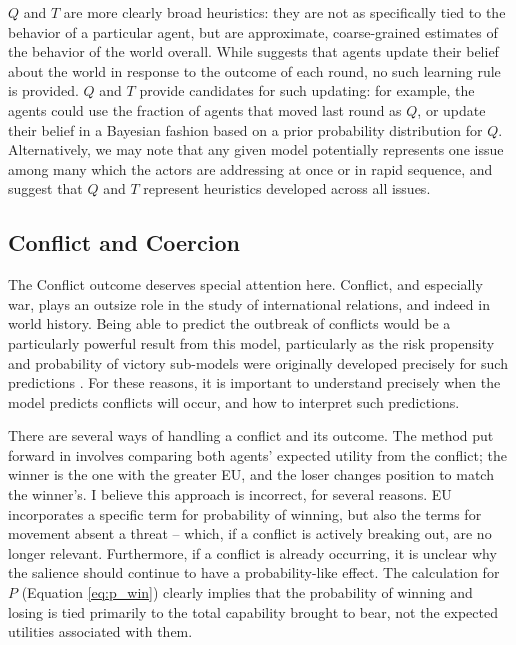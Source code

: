 $Q$ and $T$ are more clearly broad heuristics: they are not as specifically tied to the behavior of a particular agent, but are approximate, coarse-grained estimates of the behavior of the world overall. While \citet{bdm_2002} suggests that agents update their belief about the world in response to the outcome of each round, no such learning rule is provided. $Q$ and $T$ provide candidates for such updating: for example, the agents could use the fraction of agents that moved last round as $Q$, or update their belief in a Bayesian fashion based on a prior probability distribution for $Q$. Alternatively, we may note that any given model potentially represents one issue among many which the actors are addressing at once or in rapid sequence, and suggest that $Q$ and $T$ represent heuristics developed across all issues.

\subsection{Conflict and Coercion} \label{conflict_coercion}

The Conflict outcome deserves special attention here. Conflict, and especially war, plays an outsize role in the study of international relations, and indeed in world history. Being able to predict the outbreak of conflicts would be a particularly powerful result from this model, particularly as the risk propensity and probability of victory sub-models were originally developed precisely for such predictions \citep{bdm_1985}. For these reasons, it is important to understand precisely when the model predicts conflicts will occur, and how to interpret such predictions.

There are several ways of handling a conflict and its outcome. The method put forward in \citet{scholz_2011} involves comparing both agents' expected utility from the conflict; the winner is the one with the greater EU, and the loser changes position to match the winner's. I believe this approach is incorrect, for several reasons. EU incorporates a specific term for probability of winning, but also the terms for movement absent a threat -- which, if a conflict is actively breaking out, are no longer relevant. Furthermore, if a conflict is already occurring, it is unclear why the salience should continue to have a probability-like effect. The calculation for $P$ (Equation \ref{eq:p_win}) clearly implies that the probability of winning and losing is tied primarily to the total capability brought to bear, not the expected utilities associated with them.

